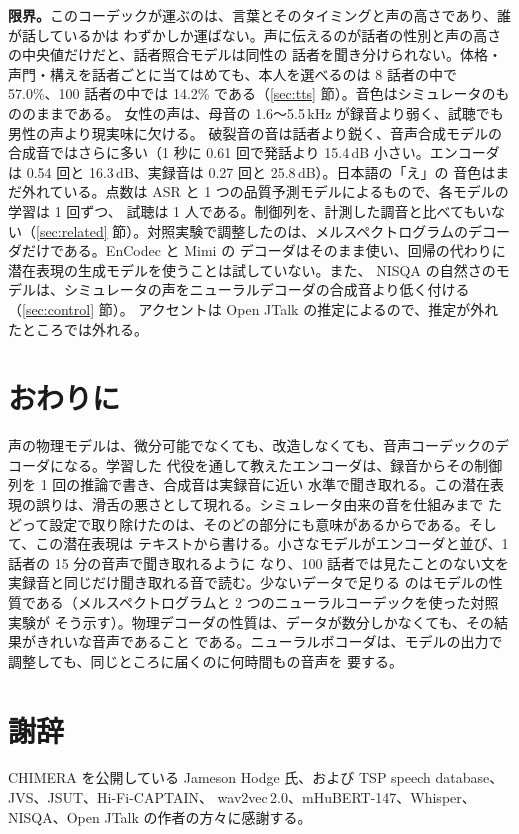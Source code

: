 \documentclass[10pt,a4paper,twocolumn]{article}
\begin{document}
\textbf{限界。}このコーデックが運ぶのは、言葉とそのタイミングと声の高さであり、誰が話しているかは
わずかしか運ばない。声に伝えるのが話者の性別と声の高さの中央値だけだと、話者照合モデルは同性の
話者を聞き分けられない。体格・声門・構えを話者ごとに当てはめても、本人を選べるのは 8 話者の中で
57.0\%、100 話者の中では 14.2\% である（\ref{sec:tts} 節）。音色はシミュレータのもののままである。
女性の声は、母音の 1.6〜5.5\,kHz が録音より弱く、試聴でも男性の声より現実味に欠ける。
破裂音の音は話者より鋭く、音声合成モデルの合成音ではさらに多い（1 秒に 0.61 回で発話より
15.4\,dB 小さい。エンコーダは 0.54 回と 16.3\,dB、実録音は 0.27 回と 25.8\,dB）。日本語の「え」の
音色はまだ外れている。点数は ASR と 1 つの品質予測モデルによるもので、各モデルの学習は 1 回ずつ、
試聴は 1 人である。制御列を、計測した調音と比べてもいない（\ref{sec:related} 節）。対照実験で調整したのは、メルスペクトログラムのデコーダだけである。EnCodec と Mimi の
デコーダはそのまま使い、回帰の代わりに潜在表現の生成モデルを使うことは試していない。また、
NISQA の自然さのモデルは、シミュレータの声をニューラルデコーダの合成音より低く付ける
（\ref{sec:control} 節）。
アクセントは Open JTalk の推定によるので、推定が外れたところでは外れる。

\section{おわりに}
声の物理モデルは、微分可能でなくても、改造しなくても、音声コーデックのデコーダになる。学習した
代役を通して教えたエンコーダは、録音からその制御列を 1 回の推論で書き、合成音は実録音に近い
水準で聞き取れる。この潜在表現の誤りは、滑舌の悪さとして現れる。シミュレータ由来の音を仕組みまで
たどって設定で取り除けたのは、そのどの部分にも意味があるからである。そして、この潜在表現は
テキストから書ける。小さなモデルがエンコーダと並び、1 話者の 15 分の音声で聞き取れるように
なり、100 話者では見たことのない文を実録音と同じだけ聞き取れる音で読む。少ないデータで足りる
のはモデルの性質である（メルスペクトログラムと 2 つのニューラルコーデックを使った対照実験が
そう示す）。物理デコーダの性質は、データが数分しかなくても、その結果がきれいな音声であること
である。ニューラルボコーダは、モデルの出力で調整しても、同じところに届くのに何時間もの音声を
要する。

\section*{謝辞}
CHIMERA を公開している Jameson Hodge 氏、および TSP speech database、JVS、JSUT、Hi-Fi-CAPTAIN、
wav2vec\,2.0、mHuBERT-147、Whisper、NISQA、Open JTalk の作者の方々に感謝する。
\end{document}
